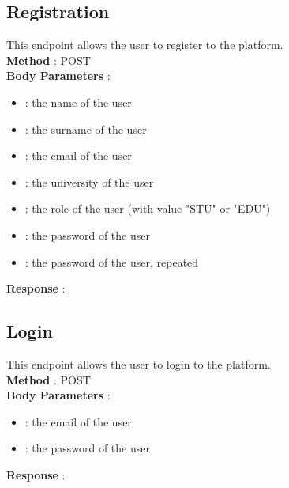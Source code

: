 \subsection*{Registration}
This endpoint allows the user to register to the platform.\\
\textbf{Method} : POST \\
\textbf{Body Parameters} :
\begin{itemize}
    \item {} : the name of the user
    \item {} : the surname of the user
    \item {} : the email of the user
    \item {} : the university of the user
    \item {} : the role of the user (with value "STU" or "EDU")
    \item {} : the password of the user
    \item {} : the password of the user, repeated
\end{itemize}
\textbf{Response} :

\subsection*{Login}
This endpoint allows the user to login to the platform.\\
\textbf{Method} : POST \\
\textbf{Body Parameters} :
\begin{itemize}
    \item {} : the email of the user
    \item {} : the password of the user
\end{itemize}
\textbf{Response} :

\newpage

